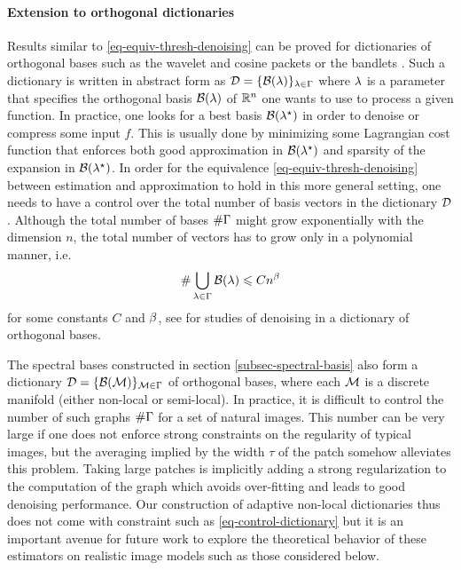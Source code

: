 \documentclass[final]{siamltex}
\begin{document}
\paragraph{Extension to orthogonal dictionaries}

Results similar to \eqref{eq-equiv-thresh-denoising} can be proved for dictionaries of orthogonal bases such as the wavelet and cosine packets \cite{coifman-wavelet-packets} or the bandlets \cite{bandelets-siam}. Such a dictionary is written in abstract form as $\mathcal{D} = \{\mathcal{B}(\lambda)\}_{\lambda \in \Gamma}$ where $\lambda$ is a parameter that specifies the orthogonal basis $\mathcal{B}(\lambda)$ of $\mathbb{R}^n$ one wants to use to process a given function. In practice, one looks for a best basis $\mathcal{B}(\lambda^\star)$ in order to denoise or compress some input $f$. This is usually done by minimizing some Lagrangian cost function \cite{coifman-wavelet-packets} that enforces both good approximation in $\mathcal{B}(\lambda^\star)$ and sparsity of the expansion in $\mathcal{B}(\lambda^\star)$. In order for the equivalence \eqref{eq-equiv-thresh-denoising} between estimation and approximation to hold in this more general setting, one needs to have a control over the total number of basis vectors in the dictionary $\mathcal{D}$. Although the total number of bases $\#\Gamma$ might grow exponentially with the dimension $n$, the total number of vectors has to grow only in a polynomial manner, i.e. 
\begin{equation}
	\label{eq-control-dictionary}
	\# \bigcup_{\la \in \Ga} \Bb(\la) \leq C n^{\beta}
\end{equation}
for some constants $C$ and $\beta$, see \cite{krim-denoising,bandelets-denoising} for studies of denoising in a dictionary of orthogonal bases.

The spectral bases constructed in section \ref{subsec-spectral-basis} also form a dictionary $\mathcal{D} = \{\mathcal{B}(\mathcal{M})\}_{\mathcal{M} \in \Gamma}$ of orthogonal bases, where each $\mathcal{M}$ is a discrete manifold (either non-local or semi-local). In practice, it is difficult to control the number of such graphs $\#\Gamma$ for a set of natural images. This number can be very large if one does not enforce strong constraints on the regularity of typical images, but the averaging implied by the width $\tau$ of the patch somehow alleviates this problem. Taking large patches is implicitly adding a strong regularization to the computation of the graph which avoids over-fitting and leads to good denoising performance. Our construction of adaptive non-local dictionaries thus does not come with constraint such as \eqref{eq-control-dictionary} but it is an important avenue for future work to explore the theoretical behavior of these estimators on realistic image models such as those considered below.
\end{document}
